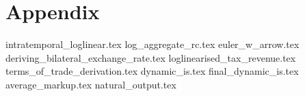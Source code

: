 \section{Appendix}
\appendix 
\renewcommand{\theequation}{A.\arabic{equation}}
{intratemporal_loglinear.tex}
{log_aggregate_rc.tex}
{euler_w_arrow.tex}
{deriving_bilateral_exchange_rate.tex}
{loglinearised_tax_revenue.tex}
{terms_of_trade_derivation.tex}
{dynamic_is.tex}
{final_dynamic_is.tex}
{average_markup.tex}
{natural_output.tex}
